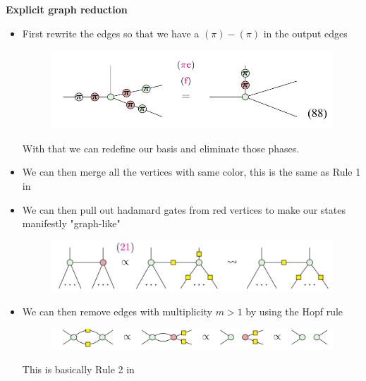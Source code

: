 \documentclass[aspectratio=169,xcolor=dvipsnames, t]{beamer}
\begin{document}
\begin{frame}
    \textbf{Explicit graph reduction}\\
    \begin{itemize}
        \item First rewrite the edges so that we have a $(\pi)-(\pi)$ in the output edges
        \begin{figure}
            \includegraphics[width=.8\textwidth]{figures/zx_graph_reduce_1.png}
        \end{figure}
        With that we can redefine our basis and eliminate those phases.
        \item We can then merge all the vertices with same color, this is the same as Rule 1 in \cite{wei2011_aklt_honeycomb}
    \end{itemize}
\end{frame}

\begin{frame}
    \begin{itemize}
        \item We can then pull out hadamard gates from red vertices to make our states manifestly "graph-like"
        \begin{figure}
            \includegraphics[width=.8\textwidth]{figures/zx_graph_reduce_2.png}
        \end{figure}
        \vspace{1cm}
        \item We can then remove edges with multiplicity $m>1$ by using the Hopf rule
        \begin{figure}
            \includegraphics[width=.8\textwidth]{figures/zx_graph_reduce_3.png}
        \end{figure}
        This is basically Rule 2 in \cite{wei2011_aklt_honeycomb}
    \end{itemize}
\end{frame}
\end{document}
